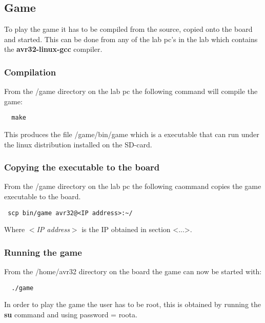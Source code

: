 \subsection{Game}

To play the game it has to be compiled from the source, copied onto the board and started.
This can be done from any of the lab pc's in the lab which contains the {\bf avr32-linux-gcc} compiler.

\subsubsection{Compilation}
From the /game directory on the lab pc the following command will compile the game:
\begin{verbatim}
  make
\end{verbatim}

This produces the file /game/bin/game which is a executable that can run under the linux distribution
installed on the SD-card.

\subsubsection{Copying the executable to the board}
From the /game directory on the lab pc the following caommand copies the game executable to the board.
\begin{verbatim}
 scp bin/game avr32@<IP address>:~/
\end{verbatim}
Where {\it $<$IP address$>$} is the IP obtained in section <...>.

\subsubsection{Running the game}
From the /home/avr32 directory on the board the game can now be started with:
\begin{verbatim}
  ./game
\end{verbatim}

In order to play the game the user has to be root, this is obtained by running the {\bf su} command
and using password = roota.
